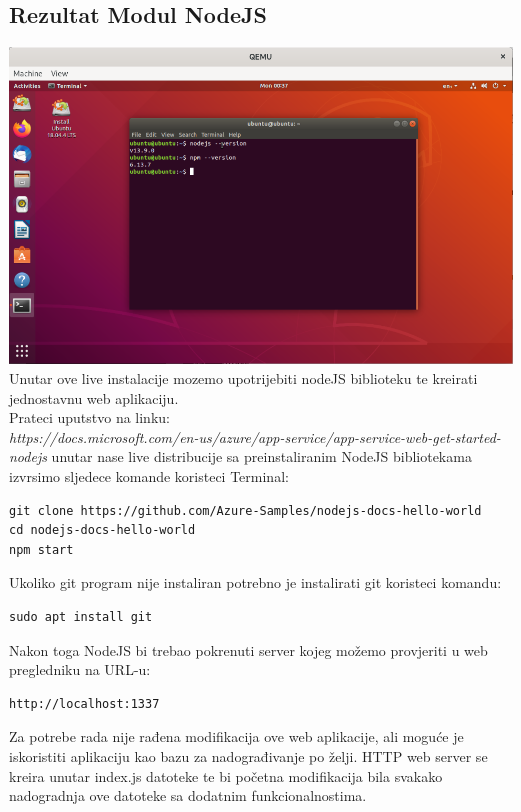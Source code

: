\documentclass[12pt,vi]{mitthesis}
\begin{document}
\subsection*{Rezultat Modul NodeJS}
\includegraphics[width=\linewidth]{images/ModulNodeJSUbuntu.png} 
Unutar ove live instalacije mozemo upotrijebiti nodeJS biblioteku te kreirati jednostavnu web aplikaciju.\\
Prateci uputstvo na linku:\\
\textit{https://docs.microsoft.com/en-us/azure/app-service/app-service-web-get-started-nodejs}
unutar nase live distribucije sa preinstaliranim NodeJS bibliotekama izvrsimo sljedece komande koristeci Terminal:
\begin{lstlisting}[style=BashInputStyle]
git clone https://github.com/Azure-Samples/nodejs-docs-hello-world
cd nodejs-docs-hello-world
npm start
\end{lstlisting}
Ukoliko git program nije instaliran potrebno je instalirati git koristeci komandu:
\begin{lstlisting}[style=BashInputStyle]
sudo apt install git
\end{lstlisting}
Nakon toga NodeJS bi trebao pokrenuti server kojeg možemo provjeriti u web pregledniku na URL-u:
\begin{lstlisting}[style=BashInputStyle]
http://localhost:1337
\end{lstlisting}
Za potrebe rada nije rađena modifikacija ove web aplikacije, ali moguće je iskoristiti aplikaciju kao bazu za nadograđivanje po želji. HTTP web server se kreira unutar index.js datoteke te bi početna modifikacija bila svakako nadogradnja ove datoteke sa dodatnim funkcionalnostima.\\
\end{document}
